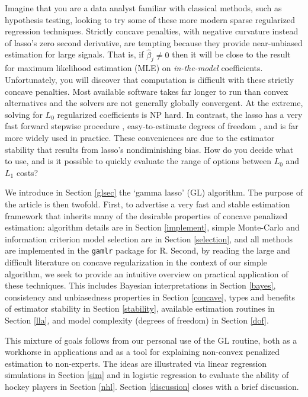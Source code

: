 \documentclass[12pt]{article}
\begin{document}
Imagine that you are a data analyst familiar with classical methods, such as
hypothesis testing,  looking to try some of these more modern sparse
regularized regression techniques.  Strictly concave penalties, with negative
curvature instead of lasso's zero second derivative,  are tempting because
they provide near-unbiased estimation for large signals.  That is, if
$\hat\beta_j\neq0$ then it will be close to the result for  maximum likelihood
estimation (MLE) on {\it in-the-model} coefficients. Unfortunately, you will
discover that computation is difficult with these strictly concave penalties.
Most available software takes far longer to run than convex
alternatives and the solvers are not generally globally convergent.  At the
extreme, solving for $L_0$ regularized coefficients is NP hard. In contrast,
the lasso has a very fast forward stepwise procedure \citep{efron_least_2004},
easy-to-estimate degrees of freedom \citep{zou_degrees_2007}, and is far more
widely used in practice. These conveniences are due to the estimator stability
that results from lasso's nondiminishing bias. How do you decide what to use,
and is it possible to quickly evaluate the range of options between $L_0$ and
$L_1$ costs?

We introduce in Section \ref{glsec} the `gamma lasso' (GL) algorithm.  The
purpose of the article is then twofold. First, to advertise a very fast and
stable estimation framework that inherits many of the desirable properties of
concave penalized estimation: algorithm details are in Section
\ref{implement}, simple Monte-Carlo and information criterion model selection
are in Section \ref{selection},  and all methods are implemented in the {\tt gamlr}
package for {\sf R}.  Second, by reading the large and difficult literature on
concave regularization   in the context of our simple algorithm, we seek to
provide an intuitive overview on practical application of these techniques.
This includes Bayesian interpretations in Section \ref{bayes}, consistency and
unbiasedness properties in Section \ref{concave}, types and benefits of
estimator stability in Section \ref{stability}, available estimation routines
in Section \ref{lla}, and model complexity (degrees of freedom) in Section
\ref{dof}.

This mixture of goals follows from our personal use of the GL routine, both as
a workhorse in applications and as a tool for explaining non-convex penalized
estimation to non-experts.  The ideas are illustrated via linear regression
simulations in Section \ref{sim} and in logistic regression to evaluate
the ability of hockey players in Section \ref{nhl}. Section \ref{discussion}
closes with a brief discussion.
\end{document}
